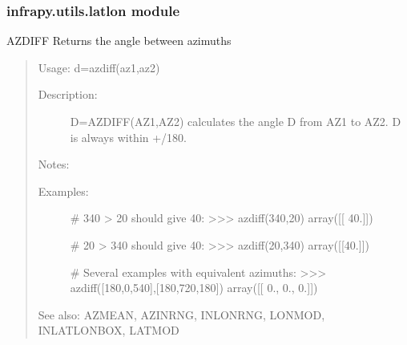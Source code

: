 \documentclass[letterpaper,10pt,english]{sphinxmanual}
\begin{document}
\subsubsection{infrapy.utils.latlon module}
\label{\detokenize{infrapy.utils:module-infrapy.utils.latlon}}\label{\detokenize{infrapy.utils:infrapy-utils-latlon-module}}

\begin{fulllineitems}
\label{\detokenize{infrapy.utils:infrapy.utils.latlon.azdiff}}
AZDIFF    Returns the angle between azimuths
\begin{quote}

Usage:    d=azdiff(az1,az2)
\begin{description}
\item[{Description:}] \leavevmode
D=AZDIFF(AZ1,AZ2) calculates the angle D from AZ1 to AZ2.  D is
always within +/\sphinxhyphen{}180.

\end{description}

Notes:
\begin{description}
\item[{Examples:}] \leavevmode
\# 340 \textendash{}\textgreater{} 20 should give 40:
\textgreater{}\textgreater{}\textgreater{} azdiff(340,20)
array({[}{[} 40.{]}{]})

\# 20 \textendash{}\textgreater{} 340 should give \sphinxhyphen{}40:
\textgreater{}\textgreater{}\textgreater{} azdiff(20,340)
array({[}{[}\sphinxhyphen{}40.{]}{]})

\# Several examples with equivalent azimuths:
\textgreater{}\textgreater{}\textgreater{} azdiff({[}180,0,540{]},{[}\sphinxhyphen{}180,720,\sphinxhyphen{}180{]})
array({[}{[} 0.,  0.,  0.{]}{]})

\end{description}

See also: AZMEAN, AZINRNG, INLONRNG, LONMOD, INLATLONBOX, LATMOD
\end{quote}

\end{fulllineitems}

\end{document}
